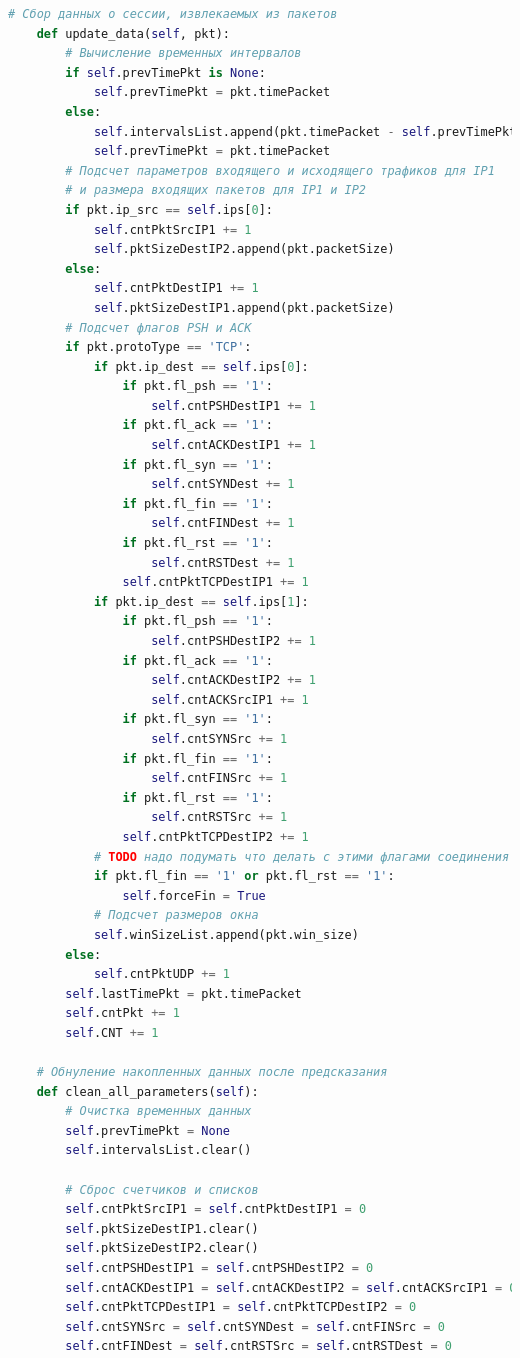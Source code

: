 \documentclass[bachelor, och, coursework]{SCWorks}
\begin{document}
\begin{lstlisting}[language=Python]
    # Сбор данных о сессии, извлекаемых из пакетов
    def update_data(self, pkt):
        # Вычисление временных интервалов
        if self.prevTimePkt is None:
            self.prevTimePkt = pkt.timePacket
        else:
            self.intervalsList.append(pkt.timePacket - self.prevTimePkt)
            self.prevTimePkt = pkt.timePacket
        # Подсчет параметров входящего и исходящего трафиков для IP1
        # и размера входящих пакетов для IP1 и IP2
        if pkt.ip_src == self.ips[0]:
            self.cntPktSrcIP1 += 1
            self.pktSizeDestIP2.append(pkt.packetSize)
        else:
            self.cntPktDestIP1 += 1
            self.pktSizeDestIP1.append(pkt.packetSize)
        # Подсчет флагов PSH и ACK
        if pkt.protoType == 'TCP':
            if pkt.ip_dest == self.ips[0]:
                if pkt.fl_psh == '1':
                    self.cntPSHDestIP1 += 1
                if pkt.fl_ack == '1':
                    self.cntACKDestIP1 += 1
                if pkt.fl_syn == '1':
                    self.cntSYNDest += 1
                if pkt.fl_fin == '1':
                    self.cntFINDest += 1
                if pkt.fl_rst == '1':
                    self.cntRSTDest += 1
                self.cntPktTCPDestIP1 += 1
            if pkt.ip_dest == self.ips[1]:
                if pkt.fl_psh == '1':
                    self.cntPSHDestIP2 += 1
                if pkt.fl_ack == '1':
                    self.cntACKDestIP2 += 1
                    self.cntACKSrcIP1 += 1
                if pkt.fl_syn == '1':
                    self.cntSYNSrc += 1
                if pkt.fl_fin == '1':
                    self.cntFINSrc += 1
                if pkt.fl_rst == '1':
                    self.cntRSTSrc += 1
                self.cntPktTCPDestIP2 += 1
            # TODO надо подумать что делать с этими флагами соединения
            if pkt.fl_fin == '1' or pkt.fl_rst == '1':
                self.forceFin = True
            # Подсчет размеров окна
            self.winSizeList.append(pkt.win_size)
        else:
            self.cntPktUDP += 1
        self.lastTimePkt = pkt.timePacket
        self.cntPkt += 1
        self.CNT += 1

    # Обнуление накопленных данных после предсказания
    def clean_all_parameters(self):
        # Очистка временных данных
        self.prevTimePkt = None
        self.intervalsList.clear()
        
        # Сброс счетчиков и списков
        self.cntPktSrcIP1 = self.cntPktDestIP1 = 0
        self.pktSizeDestIP1.clear()
        self.pktSizeDestIP2.clear()
        self.cntPSHDestIP1 = self.cntPSHDestIP2 = 0
        self.cntACKDestIP1 = self.cntACKDestIP2 = self.cntACKSrcIP1 = 0
        self.cntPktTCPDestIP1 = self.cntPktTCPDestIP2 = 0
        self.cntSYNSrc = self.cntSYNDest = self.cntFINSrc = 0
        self.cntFINDest = self.cntRSTSrc = self.cntRSTDest = 0
        

\end{lstlisting}
\end{document}
